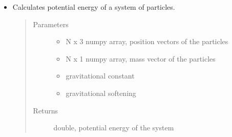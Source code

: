 \documentclass[letterpaper,10pt,english]{sphinxmanual}
\begin{document}
\begin{DUlineblock}{0em}
\item[] 
\end{DUlineblock}
\begin{itemize}
\item {} 

\begin{fulllineitems}
\label{\detokenize{physics:nbody.lib.physics.calc_pe}}
\sphinxAtStartPar
Calculates potential energy of a system of particles.
\begin{quote}\begin{description}
\item[{Parameters}] \leavevmode\begin{itemize}
\item {} 
\sphinxAtStartPar
{} \textendash{} N x 3 numpy array, position vectors of the particles

\item {} 
\sphinxAtStartPar
{} \textendash{} N x 1 numpy array, mass vector of the particles

\item {} 
\sphinxAtStartPar
{} \textendash{} gravitational constant

\item {} 
\sphinxAtStartPar
{} \textendash{} gravitational softening

\end{itemize}

\item[{Returns}] \leavevmode
\sphinxAtStartPar
double, potential energy of the system

\end{description}\end{quote}

\end{fulllineitems}


\end{itemize}
\end{document}
